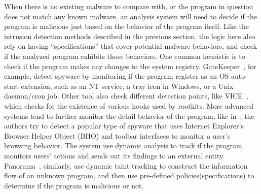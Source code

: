When there is no existing malware to compare with, or the program in question 
does not match any known malware, an analysis system will need to decide if
the program is malicious just based on the behavior of the program itself. Like
the intrusion detection methods described in the previous section, the logic
here also rely on having ``specifications'' that cover potential malware 
behaviors, and check if the analyzed program exhibits those behaviors. One 
common heuristic is to check if the program makes any changes to the system
registry. GateKeeper~\cite{wang2004gatekeeper}, for example, detect spyware
by monitoring if the program register as an OS auto-start extension, such as 
an NT service, a tray icon in Windows, or a Unix daemon/cron job. Other tool
also check different detection points, like VICE~\cite{bulter2004vice}, which
checks for the existence of various hooks used by rootkits. More advanced 
systems tend to further monitor the detail behavior of the program, like 
in~\cite{kirda2006behavior}, the authors try to detect a popular type of
spyware that uses Internet Explorer’s Browser Helper Object (BHO) and 
toolbar interfaces to monitor a user’s browsing behavior. The system use 
dynamic analysis to track if the program monitors users' actions and sends
out its findings to an external entity. Panorama~\cite{yin2007panorama}, 
similarly, use dynamic taint tracking to construct the information flow of
an unknown program, and then use pre-defined policies(specifications) to 
determine if the program is malicious or not.